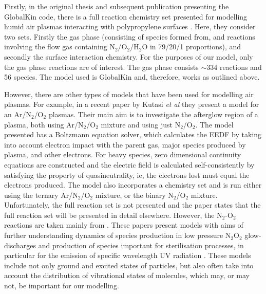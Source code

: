 \documentclass[11pt, oneside]{article}   	%
\begin{document}
Firstly, in the original thesis and subsequent publication presenting the GlobalKin code, there is a full reaction chemistry set presented for modelling humid air plasmas interacting with polypropylene surfaces \cite{Dorai2002modeling, Dorai2003a}.
Here, they consider two sets.
Firstly the gas phase (consisting of species formed from, and reactions involving the flow gas containing N$_2$/O$_2$/H$_2$O in 79/20/1 proportions), and secondly the surface interaction chemistry. 
For the purposes of our model, only the gas phase reactions are of interest.
The gas phase consists $\sim$334 reactions and 56 species. 
The model used is GlobalKin and, therefore, works as outlined above.

However, there are other types of models that have been used for modelling air plasmas.
For example, in a recent paper by Kutasi \textit{et al} \cite{Kutasi2016tuning} they present a model for an Ar/N$_2$/O$_2$ plasmas.
Their main aim is to investigate the afterglow region of a plasma, both using Ar/N$_2$/O$_2$ mixture and using just N$_2$/O$_2$.
The model presented has a Boltzmann equation solver, which calculates the EEDF by taking into account electron impact with the parent gas, major species produced by plasma, and other electrons.
For heavy species, zero dimensional continuity equations are constructed and the electric field is calculated self-consistently by satisfying the property of quasineutrality, ie, the electrons lost must equal the electrons produced.
The model also incorporates a chemistry set and is run either using the ternary Ar/N$_2$/O$_2$ mixture, or the binary N$_2$/O$_2$ mixture.
Unfortunately, the full reaction set is not presented and the paper states that the full reaction set will be presented in detail elsewhere.
However, the N$_2$-O$_2$ reactions are taken mainly from \cite{Guerra1997self, Pintassilgo2005modelling, Kutasi2008modelling}.
These papers present models with aims of further understanding dynamics of species production in low pressure N$_2$O$_2$ glow-discharges \cite{Guerra1997self} and production of species important for sterilisation processes, in particular for the emission of specific wavelength UV radiation \cite{Pintassilgo2005modelling, Kutasi2008modelling}.
These models include not only ground and excited states of particles, but also often take into account the distribution of vibrational states of molecules, which may, or may not, be important for our modelling.
\end{document}
